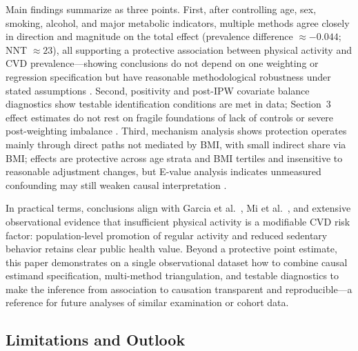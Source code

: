 \documentclass[12pt,a4paper]{article}
\begin{document}
Main findings summarize as three points. First, after controlling age, sex, smoking, alcohol, and major metabolic indicators, multiple methods agree closely in direction and magnitude on the total effect (prevalence difference $\approx -0.044$; NNT $\approx 23$), all supporting a protective association between physical activity and CVD prevalence---showing conclusions do not depend on one weighting or regression specification but have reasonable methodological robustness under stated assumptions \cite{shahu2023comparison}. Second, positivity and post-IPW covariate balance diagnostics show testable identification conditions are met in data; Section~3 effect estimates do not rest on fragile foundations of lack of controls or severe post-weighting imbalance \cite{chen2024iptw,rosenbaum1983central}. Third, mechanism analysis shows protection operates mainly through direct paths not mediated by BMI, with small indirect share via BMI; effects are protective across age strata and BMI tertiles and insensitive to reasonable adjustment changes, but E-value analysis indicates unmeasured confounding may still weaken causal interpretation \cite{vanderweele2017evalue}.

In practical terms, conclusions align with Garcia et al.\ \cite{garcia2023meta}, Mi et al.\ \cite{mi2025creview}, and extensive observational evidence that insufficient physical activity is a modifiable CVD risk factor: population-level promotion of regular activity and reduced sedentary behavior retains clear public health value. Beyond a protective point estimate, this paper demonstrates on a single observational dataset how to combine causal estimand specification, multi-method triangulation, and testable diagnostics to make the inference from association to causation transparent and reproducible---a reference for future analyses of similar examination or cohort data.

\subsection{Limitations and Outlook}
\end{document}
